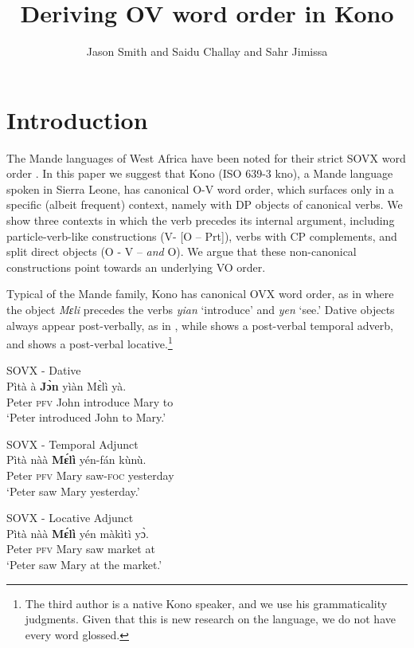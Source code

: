 \documentclass[output=paper,colorlinks,citecolor=brown,draftmode
]{langscibook}
\author{Jason Smith\affiliation{Michigan State University} and Saidu Challay \affiliation{Njala University} and  Sahr Jimissa \affiliation{Milton Margai Technical Univeristy}}
\title{Deriving OV word order in Kono}
\begin{document}
\maketitle



\section{Introduction}

The Mande languages of West Africa have been noted for their strict SOVX word order \citep{Gensler1994reconstructing, creissels2005sovx, nikitina2009syntax}. In this paper we suggest that Kono (ISO 639-3 kno), a Mande language spoken in Sierra Leone, has canonical O-V word order, which surfaces only in a specific (albeit frequent) context, namely with DP objects of canonical verbs. We show three contexts in which the verb precedes its internal argument, including particle-verb-like constructions (V- [O – Prt]), verbs with CP complements, and split direct objects (O - V – \textit{and} O).  We argue that these non-canonical constructions point towards an underlying VO order. 

Typical of the Mande family, Kono has canonical OVX word order, as in  where the object \textit{Mɛli} precedes the verbs \textit{yian} ‘introduce’ and \textit{yen} ‘see.’ Dative objects always appear post-verbally, as in , while  shows a post-verbal temporal adverb, and  shows a post-verbal locative.\footnote{The third author is a native Kono speaker, and we use his grammaticality judgments. Given that this is new research on the language, we do not have every word glossed.}  

\ea \label{ex:Kono:Canonical}
\begin{xlist}

\ex \label{ex:Kono:Canonical with Dative}
SOVX - Dative \\
\gll Pìtà à \textbf{Jɔ̀n} yìàn Mɛ̀lì yà. \\
Peter  \textsc{pfv} John introduce Mary to\\
\glt `Peter introduced John to Mary.'

\ex \label{ex:Kono:Canonical with Temporal}
SOVX - Temporal Adjunct \\
\gll Pìtà nàà	\textbf{Mɛ́lì} yén-fán	kùnù. \\
Peter \textsc{pfv} Mary saw-\textsc{foc} yesterday \\
\glt `Peter saw Mary yesterday.' 

\ex \label{ex:Kono:Canonical with Locative}
SOVX - Locative Adjunct \\
\gll Pìtà nàà	\textbf{Mɛ́lì} yén màkìtì yɔ̀. \\
Peter \textsc{pfv} Mary saw market at \\
\glt `Peter saw Mary at the market.' 
\end{xlist}
\end{document}
